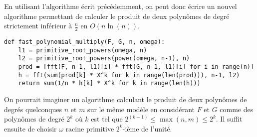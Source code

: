 	En utilisant l'algorithme écrit précédemment, on peut donc écrire un nouvel algorithme permettant de calculer le produit de deux polynômes de degré strictement inférieur à $\frac{n}{2}$ en $O(n \ln(n))$.
	
\begin{lstlisting}
def fast_polynomial_multiply(F, G, n, omega):
	l1 = primitive_root_powers(omega, n)
	l2 = primitive_root_powers(power(omega, n-1), n)
	prod = [fft(F, n-1, l1)[i] * fft(G, n-1, l1)[i] for i in range(n)]
	h = fft(sum(prod[k] * X^k for k in range(len(prod))), n-1, l2)
	return sum(1/n * h[k] * X^k for k in range(len(h)))
\end{lstlisting}

	\begin{remark}
		On pourrait imaginer un algorithme calculant le produit de deux polynômes de degrés quelconques $n$ et $m$ sur le même modèle en considérant $F$ et $G$ comme des polynômes de degré $2^k$ où $k$ est tel que $2^(k-1) \leq
		\max(n, m) \leq 2^k$. Il suffit ensuite de choisir $\omega$ racine primitive $2^k$-ième de l'unité.
	\end{remark}
	
